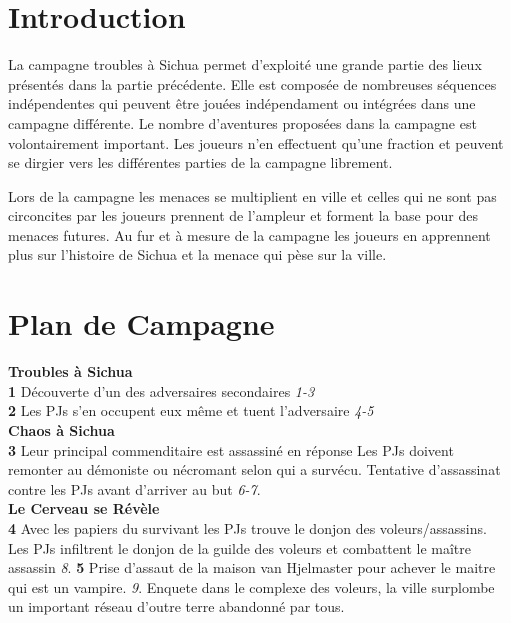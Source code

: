 
\section{Introduction}

La campagne troubles à Sichua permet d'exploité une grande partie des lieux présentés dans la partie 
précédente. Elle est composée de nombreuses séquences indépendentes qui peuvent être jouées indépendament
ou intégrées dans une campagne différente. Le nombre d'aventures proposées dans la campagne est 
volontairement important. Les joueurs n'en effectuent qu'une fraction et peuvent
se dirgier vers les différentes parties de la campagne librement. 

Lors de la campagne les menaces se multiplient en ville et celles qui ne sont pas circoncites par les 
joueurs prennent de l'ampleur et forment la base pour des menaces futures. Au fur et à mesure de la campagne
les joueurs en apprennent plus sur l'histoire de Sichua et la menace qui pèse sur la ville.

\section{Plan de Campagne}

{\bfseries Troubles à Sichua} \\
{\bf 1} Découverte d'un des adversaires secondaires {\it 1-3} \\
{\bf 2} Les PJs s'en occupent eux même et tuent l'adversaire {\it 4-5} \\

{\bf Chaos à Sichua} \\
{\bf 3} Leur principal commenditaire est assassiné en réponse
  Les PJs doivent remonter au démoniste ou nécromant selon qui a survécu.
  Tentative d'assassinat contre les PJs avant d'arriver au but {\it 6-7}. \\

{\bf Le Cerveau se Révèle} \\
{\bf 4} Avec les papiers du survivant les PJs trouve le donjon des voleurs/assassins. 
        Les PJs infiltrent le donjon de la guilde des voleurs et combattent le maître assassin {\it 8}.
{\bf 5} Prise d'assaut de la maison van Hjelmaster pour achever le maitre qui est un vampire. {\it 9}.
  Enquete dans le complexe des voleurs, la ville surplombe un important réseau d'outre terre abandonné par tous. \\

